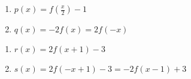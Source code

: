 \begin{multicols}{2}
\begin{enumerate}
\setcounter{enumi}{\value{HW}}

\item   $p(x) = f\left( \frac{x}{2} \right) -1$

\item  $q(x) = -2f(x) = 2f(-x)$ 

\setcounter{HW}{\value{enumi}}
\end{enumerate}
\end{multicols}



\begin{multicols}{2}
\begin{enumerate}
\setcounter{enumi}{\value{HW}}

\item  $r(x) = 2f(x+1)-3$

\item  $s(x) = 2f(-x+1)-3 = -2f(x-1)+3$  

\setcounter{HW}{\value{enumi}}
\end{enumerate}
\end{multicols}



